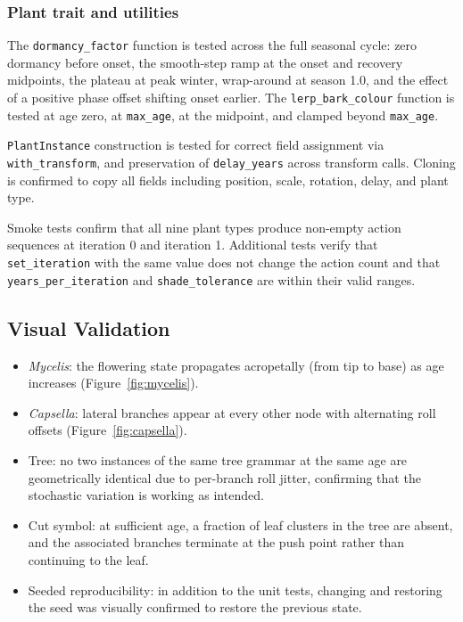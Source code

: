 \subsubsection{Plant trait and utilities}
The \texttt{dormancy\_factor} function is tested across the full seasonal cycle: zero dormancy before onset,
the smooth-step ramp at the onset and recovery midpoints, the plateau at peak winter, wrap-around at season
1.0, and the effect of a positive phase offset shifting onset earlier. The \texttt{lerp\_bark\_colour}
function is tested at age zero, at \texttt{max\_age}, at the midpoint, and clamped beyond \texttt{max\_age}.

\medskip
\texttt{PlantInstance} construction is tested for correct field assignment via \texttt{with\_transform}, and
preservation of \texttt{delay\_years} across transform calls. Cloning is confirmed to copy all fields
including position, scale, rotation, delay, and plant type.

\medskip
Smoke tests confirm that all nine plant types produce non-empty action sequences at iteration 0 and iteration
1. Additional tests verify that \texttt{set\_iteration} with the same value does not change the action count
and that \texttt{years\_per\_iteration} and \texttt{shade\_tolerance} are within their valid ranges.

\subsection{Visual Validation}

\begin{itemize}
\item \textit{Mycelis}: the flowering state propagates acropetally (from tip to base) as age increases
  (Figure~\ref{fig:mycelis}).
\item \textit{Capsella}: lateral branches appear at every other node with alternating roll offsets
  (Figure~\ref{fig:capsella}).
\item Tree: no two instances of the same tree grammar at the same age are geometrically identical due to
  per-branch roll jitter, confirming that the stochastic variation is working as intended.
\item Cut symbol: at sufficient age, a fraction of leaf clusters in the tree are absent, and the associated
  branches terminate at the push point rather than continuing to the leaf.
\item Seeded reproducibility: in addition to the unit tests, changing and restoring the seed was visually
  confirmed to restore the previous state.
\end{itemize}
